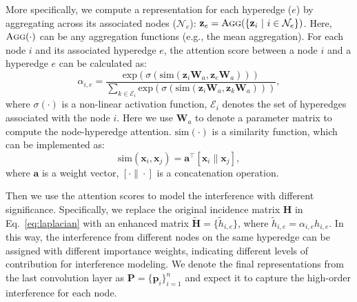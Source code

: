 More specifically, we compute a representation for each hyperedge ($e$) by aggregating across its associated nodes ($\mathcal{N}_e$): $\mathbf{z}_{e}=\textsc{Agg}(\{\mathbf{z}_i~|~i\in \mathcal{N}_e\})$. Here, $\textsc{Agg}(\cdot)$ can be any aggregation functions (e.g., the mean aggregation). For each node $i$ and its associated hyperedge $e$, 
the attention score between a node $i$ and a hyperedge $e$ can be calculated as:
\begin{equation}
    \alpha_{i,e} = \frac{\text{exp}(\sigma(\text{sim}(\mathbf{z}_i \mathbf{W}_a,\mathbf{z}_e \mathbf{W}_a)))}{\sum_{k \in \mathcal{E}_i} \text{exp}(\sigma(\text{sim}(\mathbf{z}_i \mathbf{W}_a,\mathbf{z}_k \mathbf{W}_a)))},
\end{equation}
where $\sigma(\cdot)$ is a non-linear activation function, $\mathcal{E}_i$ denotes the set of hyperedges associated with the node $i$. Here we use $\mathbf{W}_a$ to denote a parameter matrix to compute the node-hyperedge attention. %
$\text{sim}(\cdot)$ is a similarity function, which can be implemented as:
\begin{equation}
    \text{sim}(\mathbf{x}_i, \mathbf{x}_j) = \mathbf{a}^\top[\mathbf{x}_i\|\mathbf{x}_j],
\end{equation}
where $\mathbf{a}$ is a weight vector, $[\cdot\|\cdot]$ is a concatenation operation. 

Then we use the attention scores to model the interference with different significance. Specifically, we replace the original incidence matrix $\mathbf{H}$ in Eq.~\ref{eq:laplacian} with an enhanced matrix $\tilde{\mathbf{H}}=\{\tilde{h}_{i,e}\}$, where $\tilde{h}_{i,e}=\alpha_{i,e}h_{i,e}$.
In this way, the interference from different nodes on the same hyperedge can be assigned with different importance weights, indicating different levels of contribution for interference modeling. We denote the final representations from the last convolution layer as $\mathbf{P}=\{\mathbf{p}_i\}_{i=1}^n$ and expect it to capture the high-order interference for each node.


